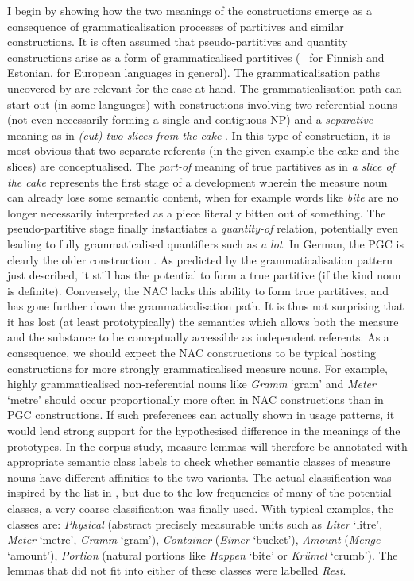 I begin by showing how the two meanings of the constructions emerge as a consequence of grammaticalisation processes of partitives and similar constructions.
It is often assumed that pseudo-partitives and quantity constructions arise as a form of grammaticalised partitives (\eg\ \citealp[536--539]{Koptjevskaja2001} for Finnish and Estonian, \citealp[559]{Koptjevskaja2001} for European languages in general).
The grammaticalisation paths uncovered by \citet[esp.\ 526--530]{Koptjevskaja2001} are relevant for the case at hand.
The grammaticalisation path can start out (in some languages) with constructions involving two referential nouns (not even necessarily forming a single and contiguous NP) and a \textit{separative} meaning as in \textit{(cut) two slices from the cake} \citep[535]{Koptjevskaja2001}.
In this type of construction, it is most obvious that two separate referents (in the given example the cake and the slices) are conceptualised.
The \textit{part-of} meaning of true partitives as in \textit{a slice of the cake} represents the first stage of a development wherein the measure noun can already lose some semantic content, when for example words like \textit{bite} are no longer necessarily interpreted as a piece literally bitten out of something.
The pseudo-partitive stage finally instantiates a \textit{quantity-of} relation, potentially even leading to fully grammaticalised quantifiers such as \textit{a lot}.
In German, the PGC is clearly the older construction \citep{Zimmer2015}.
As predicted by the grammaticalisation pattern just described, it still has the potential to form a true partitive (if the kind noun is definite).
Conversely, the NAC lacks this ability to form true partitives, and has gone further down the grammaticalisation path.
It is thus not surprising that it has lost (at least prototypically) the semantics which allows both the measure and the substance to be conceptually accessible as independent referents.
As a consequence, we should expect the NAC constructions to be typical hosting constructions for more strongly grammaticalised measure nouns.
For example, highly grammaticalised non-referential nouns like \textit{Gramm} `gram' and \textit{Meter} `metre' should occur proportionally more often in NAC constructions than in PGC constructions.
If such preferences can actually shown in usage patterns, it would lend strong support for the hypothesised difference in the meanings of the prototypes.
In the corpus study, measure lemmas will therefore be annotated with appropriate semantic class labels to check whether semantic classes of measure nouns have different affinities to the two variants.
The actual classification was inspired by the list in \citet[530]{Koptjevskaja2001}, but due to the low frequencies of many of the potential classes, a very coarse classification was finally used.
With typical examples, the classes are:
\textit{Physical} (abstract precisely measurable units such as \textit{Liter} `litre', \textit{Meter} `metre', \textit{Gramm} `gram'),
\textit{Container} (\textit{Eimer} `bucket'),
\textit{Amount} (\textit{Menge} `amount'), 
\textit{Portion} (natural portions like \textit{Happen} `bite' or \textit{Krümel} `crumb').
The lemmas that did not fit into either of these classes were labelled \textit{Rest}.


